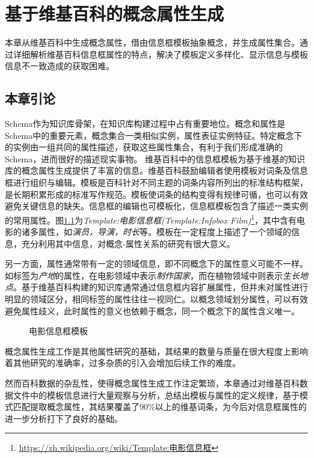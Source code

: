\chapter{基于维基百科的概念属性生成}
\label{cha:concept-property}
本章从维基百科中生成概念属性，借由信息框模板抽象概念，并生成属性集合。通过详细解析维基百科信息框属性的特点，解决了模板定义多样化、显示信息与模板信息不一致造成的获取困难。

\section{本章引论}

Schema作为知识库骨架，在知识库构建过程中占有重要地位。概念和属性是Schema中的重要元素，概念集合一类相似实例，属性表征实例特征。特定概念下的实例由一组共同的属性描述，获取这些属性集合，有利于我们形成准确的Schema，进而很好的描述现实事物。
维基百科中的信息框模板为基于维基的知识库的概念属性生成提供了丰富的信息。维基百科鼓励编辑者使用模板对词条及信息框进行组织与编辑。模板是百科针对不同主题的词条内容所列出的标准结构框架，是长期积累形成的标准写作规范。模板使词条的结构变得有规律可循，也可以有效避免关键信息的缺失。信息框的编辑也可模板化，信息框模板包含了描述一类实例的常用属性。图\ref{fig:template-infobox-film}为\textit{Template:电影信息框(Template:Infobox Film)}\footnote{\url{https://zh.wikipedia.org/wiki/Template:电影信息框}}，其中含有电影的诸多属性，如\textit{演员，导演，时长}等。模板在一定程度上描述了一个领域的信息，充分利用其中信息，对概念-属性关系的研究有很大意义。

另一方面，属性通常带有一定的领域信息，即不同概念下的属性意义可能不一样。如标签为\textit{产地}的属性，在电影领域中表示\textit{制作国家}，而在植物领域中则表示\textit{生长地点}。基于维基百科构建的知识库通常通过信息框内容扩展属性，但并未对属性进行明显的领域区分，相同标签的属性往往一视同仁。以概念领域划分属性，可以有效避免属性歧义，此时属性的意义也依赖于概念，同一个概念下的属性含义唯一。

\begin{figure}[ht]
  \centering
  \caption{电影信息框模板}
  \label{fig:template-infobox-film}
\end{figure}

概念属性生成工作是其他属性研究的基础，其结果的数量与质量在很大程度上影响着其他研究的准确率，过多杂质的引入会增加后续工作的难度。

然而百科数据的杂乱性，使得概念属性生成工作注定繁琐，本章通过对维基百科数据文件中的模板信息进行大量观察与分析，总结出模板与属性的定义规律，基于模式匹配提取概念属性，其结果覆盖了90\%以上的维基词条，为今后对信息框属性的进一步分析打下了良好的基础。

